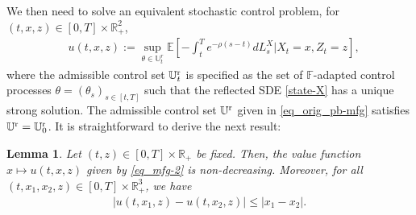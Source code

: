 \documentclass[11pt,times,letter]{article}
\newcommand{\Ex}{ \mathbb{E} }
\newcommand{\Fx}{\mathbb{F} }
\newcommand{\R}{\mathds{R}}
\numberwithin{equation}{section}
\newtheorem{lemma}[theorem]{Lemma}
\begin{document}
We then need to solve an equivalent stochastic control problem, for $(t,x,z)\in[0,T]\times\R_+^2$, 
\begin{align}\label{eq_mfg-2}
&u(t,x,z):=\text{$\sup_{\theta\in \mathbb{U}_t^r} \Ex\left[  -\int_t^{T} e^{-\rho (s-t)}dL_s^X\Big|X_t=x,Z_t=z \right]$},
\end{align}
where the admissible control set $\mathbb{U}_t^{\rm r}$ is specified as the set of $\Fx$-adapted control processes $\theta=(\theta_s)_{s\in[t,T]}$ such that the reflected SDE \eqref{state-X} has a unique strong solution. The admissible control set $\mathbb{U}^{\rm r}$ given in \eqref{eq_orig_pb-mfg} satisfies $\mathbb{U}^{\rm r}=\mathbb{U}^{\rm r}_0$. 
It is straightforward to derive the next result:
\begin{lemma}\label{lem:propoertyu}
Let $(t,z)\in[0,T]\times \R_+$ be fixed. Then, the value function $x\mapsto u(t,x,z)$ given by \eqref{eq_mfg-2} is non-decreasing. Moreover, for all $(t,x_1,x_2,z)\in[0,T]\times \R_+^3$, we have
\begin{align}\label{eq:lipvx}
\left|u(t,x_1,z)-u(t,x_2,z)\right|\leq  |x_1-x_2|.
\end{align}
\end{lemma}
\end{document}
